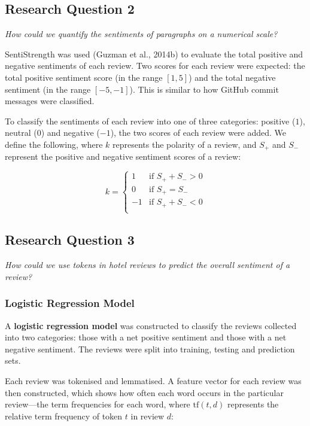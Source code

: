 \documentclass[12pt, bibliography=totocnumbered, a4paper]{scrartcl}
\def\bf#1{\textbf{#1}}
\def\it#1{\textit{#1}}
\begin{document}
\subsection{Research Question 2}
\it{How could we quantify the sentiments of paragraphs on a numerical scale?}

SentiStrength was used (Guzman et al., 2014b) to evaluate the total positive %
and negative sentiments of each review. Two scores for each review were expected:
the total positive sentiment score (in the range \([1, 5]\)) and the total negative
sentiment (in the range \([-5, -1]\)). This is similar to how GitHub commit
messages were classified.

To classify the sentiments of each review into one of three categories:
positive (\(1\)), neutral (\(0\)) and negative (\(-1\)), the two scores of each review
were added. We define the following, where \(k\) represents the polarity of a review,
and \(S_+\) and \(S_-\) represent the positive and negative sentiment scores of a review:

\begin{equation}
	k = \begin{cases}
		1  & \text{if } S_+ + S_- > 0 \\
		0  & \text{if } S_+ = S_-     \\
		-1 & \text{if } S_+ + S_- < 0 \\
	\end{cases}
	\label{eq:polarity}
\end{equation}

\subsection{Research Question 3}
\it{How could we use tokens in hotel reviews to predict the overall sentiment of a review?}

\subsubsection{Logistic Regression Model}
A \bf{logistic regression model} was constructed to classify the reviews collected into
two categories: those with a net positive sentiment and those with a net negative sentiment.
The reviews were split into training, testing and prediction sets.

Each review was tokenised and lemmatised. A feature vector for each review was
then constructed, which shows how often each word occurs in the particular review---the
term frequencies for each word, where \(\text{tf}(t,d)\) represents the relative term frequency of
token \(t\) in review \(d\):
\end{document}
